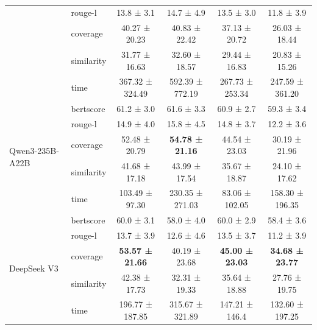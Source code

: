 \documentclass{article}
\begin{document}
\begin{table}[ht!]
\begin{tabular}{ll|c|c|c|c}
 & rouge-l   & 13.8 ± 3.1 & 14.7 ± 4.9 & 13.5 ± 3.0 & 11.8 ± 3.9 \\
 & coverage  & 40.27 ± 20.23 & 40.83 ± 22.42 & 37.13 ± 20.72 & 26.03 ± 18.44 \\
 & similarity& 31.77 ± 16.63 & 32.60 ± 18.57 & 29.44 ± 16.83 & 20.83 ± 15.26 \\
 & time      & 367.32 ± 324.49 & 592.39 ± 772.19 & 267.73 ± 253.34 & 247.59 ± 361.20 \\
 \midrule
\multirow{5}{*}{Qwen3-235B-A22B}
 & bertscore & 61.2 ± 3.0 & 61.6 ± 3.3 & 60.9 ± 2.7 & 59.3 ± 3.4 \\
 & rouge-l   & 14.9 ± 4.0 & 15.8 ± 4.5 & 14.8 ± 3.7 & 12.2 ± 3.6 \\
 & coverage  & 52.48 ± 20.79 & \textbf{54.78 ± 21.16} & 44.54 ± 23.03 & 30.19 ± 21.96 \\
 & similarity& 41.68 ± 17.18 & 43.99 ± 17.54 & 35.67 ± 18.87 & 24.10 ± 17.62 \\
 & time      & 103.49 ± 97.30 & 230.35 ± 271.03 & 83.06 ± 102.05 & 158.30 ± 196.35 \\
\midrule
\multirow{5}{*}{DeepSeek V3}
 & bertscore & 60.0 ± 3.1 & 58.0 ± 4.0 & 60.0 ± 2.9 & 58.4 ± 3.6 \\
 & rouge-l   & 13.7 ± 3.9 & 12.6 ± 4.6 & 13.5 ± 3.7 & 11.2 ± 3.9 \\
 & coverage  & \textbf{53.57 ± 21.66} & 40.19 ± 23.68 & \textbf{45.00 ± 23.03} & \textbf{34.68 ± 23.77} \\
 & similarity& 42.38 ± 17.73 & 32.31 ± 19.33 & 35.64 ± 18.88 & 27.76 ± 19.75 \\
 & time      & 196.77 ± 187.85 & 315.67 ± 321.89 & 147.21 ± 146.4 & 132.60 ± 197.25 \\
\bottomrule
\end{tabular}
\end{table}
\end{document}

